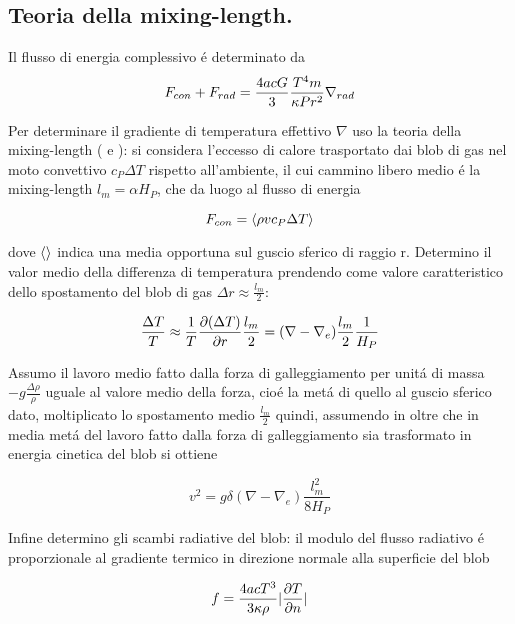 \documentclass[../main.tex]{subfiles}
\begin{document}
\subsection{Teoria della mixing-length.}

Il flusso di energia complessivo \'e determinato da
\begin{equation}
F_{con}+F_{rad}=\frac{4acG}{3}\frac{T^4m}{\kappa Pr^2}\nrad{}\label{eq:totalflux}
\end{equation}

Per determinare il gradiente di temperatura effettivo $\nabla$ uso la teoria della mixing-length (\cite{prandtl25tur} e \cite{vitense53kon}):
si considera l'eccesso di calore trasportato dai blob di gas nel moto convettivo $c_P\Delta T$ rispetto all'ambiente, il cui cammino libero medio \'e la mixing-length $l_m=\alpha H_P$, che da luogo al flusso di energia

\begin{equation}
F_{con}=\exv{\rho vc_P\Delta T}\label{eq:convectiveflux}
\end{equation}

dove $\exv{}$ indica una media opportuna sul guscio sferico di raggio r. Determino il valor medio della differenza di temperatura prendendo come valore caratteristico dello spostamento del blob di gas $\Delta r\approx\frac{l_m}{2}$:

\begin{equation}
\frac{\Delta T}{T}\approx\frac{1}{T}\PDy{r}{(\Delta T)}\frac{l_m}{2}=(\nabla-\nabla_e)\frac{l_m}{2}\frac{1}{H_P}
\end{equation}

Assumo il lavoro medio fatto dalla forza di galleggiamento per unit\'a di massa $-g\frac{\Delta\rho}{\rho}$ uguale al valore medio della forza, cio\'e la met\'a di quello al guscio sferico dato, moltiplicato lo spostamento medio $\frac{l_m}{2}$ quindi, assumendo in oltre che in media met\'a del lavoro fatto dalla forza di galleggiamento sia trasformato in energia cinetica del blob si ottiene

\begin{equation}
v^2=g\delta(\nabla-\nabla_e)\frac{l_m^2}{8H_P}\label{eq:blobvelocity}
\end{equation}

Infine determino gli scambi radiative del blob: il modulo del flusso radiativo \'e proporzionale al gradiente termico in direzione normale alla superficie del blob

\begin{equation}
f=\frac{4acT^3}{3\kappa\rho}|\PDy{n}{T}|
\end{equation}
\end{document}
